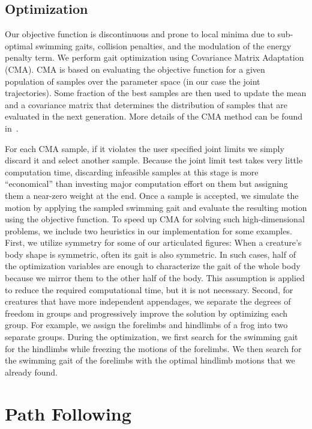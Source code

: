\subsection{Optimization}

Our objective function is discontinuous and prone to local minima due to
sub-optimal swimming gaits, collision penalties, and the modulation of the
energy penalty term.  We perform gait optimization using Covariance Matrix
Adaptation (CMA).  CMA is based on evaluating the objective function for a
given population of samples over the parameter space (in our case the
joint trajectories).  Some fraction of the best samples are then used to
update the mean and a covariance matrix that determines the distribution
of samples that are evaluated in the next generation.  More details
of the CMA method can be found in~\cite{hansen2004evaluating}.

For each CMA sample, if it violates the user specified joint limits we
simply discard it and select another sample. Because the joint limit test
takes very little computation time, discarding infeasible samples at this
stage is more ``economical'' than investing major computation effort
on them but assigning them a near-zero weight at the end. Once a sample is
accepted, we simulate the motion by applying the sampled swimming gait and
evaluate the resulting motion using the objective function. To speed up
CMA for solving such high-dimensional problems, we include two heuristics
in our implementation for some examples. First, we utilize symmetry for
some of our articulated figures: When a creature's body shape is symmetric, often its gait is also symmetric. In such cases, half of the optimization variables are enough to characterize the gait of the whole body because we mirror them to the other half of the body. This assumption is applied to reduce the required computational time, but it is not necessary.
Second, for creatures that have more
independent appendages, we separate the degrees of freedom in groups and
progressively improve the solution by optimizing each group. For example,
we assign the forelimbs and hindlimbs of a frog into two separate groups.
During the optimization, we first search for the swimming gait for the
hindlimbs while freezing the motions of the forelimbs. We then search for
the swimming gait of the forelimbs with the optimal hindlimb motions that we
already found.

\section{Path Following}

